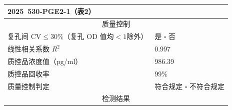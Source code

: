 \documentclass[UTF8,10pt,a4paper,fontset=fandol]{ctexart}
\newcommand{\fieldvalue}[1]{#1}
\newcommand{\handwritten}[1]{#1}
\begin{document}
\begin{tabularx}{\textwidth}{|p{}|X|}
\fieldvalue{\handwritten{2025\ 530-PGE2-1（表2）}}\\
\hline
\multicolumn{2}{|c|}{质量控制}\\
\hline
复孔间 CV$\leq 30\%$（复孔 OD 值均$<1$除外） &
\fieldvalue{\handwritten{\checkmark}} 是 \quad $\square$ 否\\
\hline
线性相关系数 $R^2$ &
\fieldvalue{\handwritten{0.997}}\\
\hline
质控品浓度值（pg/ml） &
\fieldvalue{\handwritten{986.39}}\\
\hline
质控品回收率 &
\fieldvalue{\handwritten{99\%}}\\
\hline
质量控制判定 &
\fieldvalue{\handwritten{\checkmark}} 符合规定
\quad $\square$ 不符合规定\\
\hline
\multicolumn{2}{|c|}{检测结果}\\
\hline
\end{tabularx}
\end{document}
